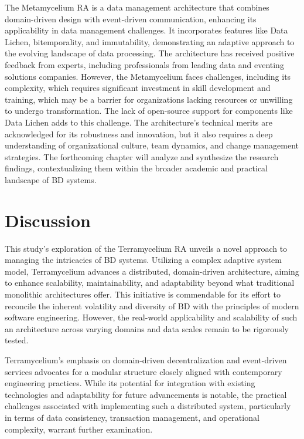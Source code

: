 \documentclass[journal]{IEEEtran}
\begin{document}
The Metamycelium RA is a data management architecture that combines domain-driven design with event-driven communication, enhancing its applicability in data management challenges. It incorporates features like Data Lichen, bitemporality, and immutability, demonstrating an adaptive approach to the evolving landscape of data processing. The architecture has received positive feedback from experts, including professionals from leading data and eventing solutions companies. However, the Metamycelium faces challenges, including its complexity, which requires significant investment in skill development and training, which may be a barrier for organizations lacking resources or unwilling to undergo transformation. The lack of open-source support for components like Data Lichen adds to this challenge. The architecture's technical merits are acknowledged for its robustness and innovation, but it also requires a deep understanding of organizational culture, team dynamics, and change management strategies. The forthcoming chapter will analyze and synthesize the research findings, contextualizing them within the broader academic and practical landscape of BD systems.


\section{Discussion} \label{sec:discussion}

This study's exploration of the Terramycelium RA unveils a novel approach to managing the intricacies of BD systems. Utilizing a complex adaptive system model, Terramycelium advances a distributed, domain-driven architecture, aiming to enhance scalability, maintainability, and adaptability beyond what traditional monolithic architectures offer. This initiative is commendable for its effort to reconcile the inherent volatility and diversity of BD with the principles of modern software engineering. However, the real-world applicability and scalability of such an architecture across varying domains and data scales remain to be rigorously tested.

Terramycelium's emphasis on domain-driven decentralization and event-driven services advocates for a modular structure closely aligned with contemporary engineering practices. While its potential for integration with existing technologies and adaptability for future advancements is notable, the practical challenges associated with implementing such a distributed system, particularly in terms of data consistency, transaction management, and operational complexity, warrant further examination.
\end{document}
